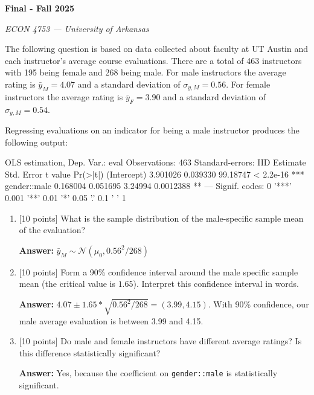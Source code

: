 \documentclass[12pt]{article}
\newcommand{\answer}[1]{{\color{blue_winged_teal}\textbf{Answer:} #1}}
\newcommand{\pts}[1]{{\color{zinc500}[#1 points]}}
\begin{document}
\begin{center}
  {\Huge\bf Final - Fall 2025}
  
  \smallskip
  {\large\it ECON 4753 — University of Arkansas}
\end{center}

\vspace{5mm}
The following question is based on data collected about faculty at UT Austin and each instructor's average course evaluations. 
There are a total of 463 instructors with 195 being female and 268 being male.
For male instructors the average rating is $\bar{y}_M = 4.07$ and a standard deviation of $\sigma_{y, M} = 0.56$.
For female instructors the average rating is  $\bar{y}_F = 3.90$ and a standard deviation of $\sigma_{y, M} = 0.54$.

Regressing evaluations on an indicator for being a male instructor produces the following output:

  \begin{smallcodeblock}[{}]
OLS estimation, Dep. Var.: eval
Observations: 463
Standard-errors: IID 
             Estimate Std. Error  t value  Pr(>|t|)    
(Intercept)  3.901026   0.039330 99.18747 < 2.2e-16 ***
gender::male 0.168004   0.051695  3.24994 0.0012388 ** 
---
Signif. codes:  0 '***' 0.001 '**' 0.01 '*' 0.05 '.' 0.1 ' ' 1
  \end{smallcodeblock}

\begin{enumerate}
  \item \pts{10} What is the sample distribution of the male-specific sample mean of the evaluation?
  
  \answer{
    $\bar{y}_M \sim \mathcal{N} (\mu_0, 0.56^2 / 268)$
  }
  
  \item \pts{10} Form a 90\% confidence interval around the male specific sample mean (the critical value is $1.65$). Interpret this confidence interval in words.

  \answer{
    $4.07 \pm 1.65 * \sqrt{0.56^2 / 268} = (3.99, 4.15)$. 
    With 90\% confidence, our male average evaluation is between 3.99 and 4.15.
  }
  
  \item \pts{10} Do male and female instructors have different average ratings? Is this difference statistically significant?
  
  \answer{
    Yes, because the coefficient on \texttt{gender::male} is statistically significant. 
  }
\end{enumerate}
\end{document}

